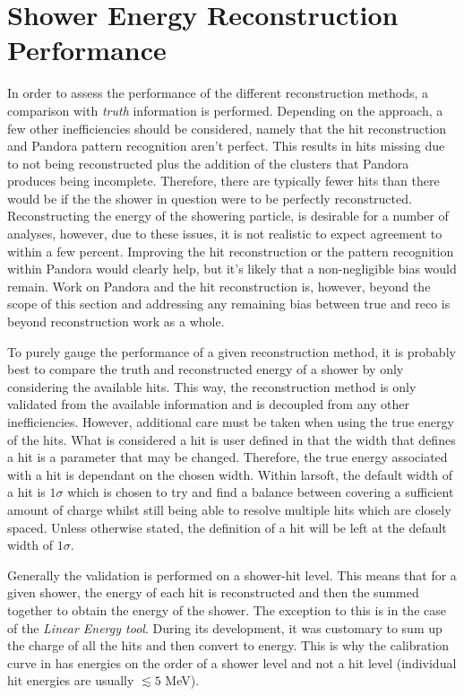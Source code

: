 \section{Shower Energy Reconstruction Performance}

In order to assess the performance of the different reconstruction methods, a comparison with \textit{truth} information is performed. Depending on the approach, a few other inefficiencies should be considered, namely that the hit reconstruction and Pandora pattern recognition aren't perfect. This results in hits missing due to not being reconstructed plus the addition of the clusters that Pandora produces being incomplete. Therefore, there are typically fewer hits than there would be if the the shower in question were to be perfectly reconstructed. Reconstructing the energy of the showering particle, is desirable for a number of analyses, however, due to these issues, it is not realistic to expect agreement to within a few percent. Improving the hit reconstruction or the pattern recognition within Pandora would clearly help, but it's likely that a non-negligible bias would remain. Work on Pandora and the hit reconstruction is, however, beyond the scope of this section and addressing any remaining bias between true and reco is beyond reconstruction work as a whole. 

To purely gauge the performance of a given reconstruction method, it is probably best to compare the truth and reconstructed energy of a shower by only considering the available hits. This way, the reconstruction method is only validated from the available information and is decoupled from any other inefficiencies. However, additional care must be taken when using the true energy of the hits. What is considered a hit is user defined in that the width that defines a hit is a parameter that may be changed. Therefore, the true energy associated with a hit is dependant on the chosen width. Within \gls{larsoft}, the default width of a hit is $1\sigma$ which is chosen to try and find a balance between covering a sufficient amount of charge whilst still being able to resolve multiple hits which are closely spaced. Unless otherwise stated, the definition of a hit will be left at the default width of $1\sigma$. 

Generally the validation is performed on a shower-hit level. This means that for a given shower, the energy of each hit is reconstructed and then the summed together to obtain the energy of the shower. The exception to this is in the case of the \textit{Linear Energy tool}. During its development, it was customary to sum up the charge of all the hits and then convert to energy. This is why the calibration curve in  has energies on the order of a shower level and not a hit level (individual hit energies are usually $\lesssim 5$ MeV).

